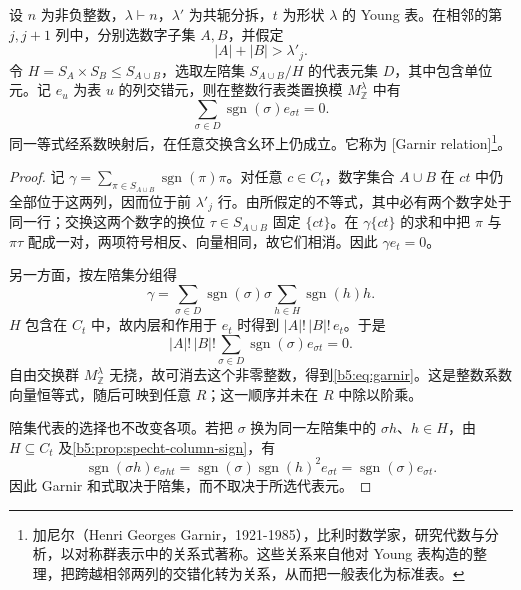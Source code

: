 \begin{lemma}[Garnir 关系]\label{b5:lem:garnir}
	设 \(n\) 为非负整数，\(\lambda\vdash n\)，\(\lambda'\) 为共轭分拆，\(t\) 为形状 \(\lambda\) 的 Young 表。在相邻的第 \(j,j+1\) 列中，分别选数字子集 \(A,B\)，并假定
	\[
		|A|+|B|>\lambda'_j.
	\]
	令 \(H=S_A\times S_B\leq S_{A\cup B}\)，选取左陪集 \(S_{A\cup B}/H\) 的代表元集 \(D\)，其中包含单位元。记 \(e_u\) 为表 \(u\) 的列交错元，则在整数行表类置换模 \(M_{\mathbb Z}^\lambda\) 中有
	\begin{equation}\label{b5:eq:garnir}
		\sum_{\sigma\in D}\operatorname{sgn}(\sigma)e_{\sigma t}=0.
	\end{equation}
	同一等式经系数映射后，在任意交换含幺环上仍成立。它称为 [Garnir relation]\footnote{加尼尔（Henri Georges Garnir，1921-1985），比利时数学家，研究代数与分析，以对称群表示中的关系式著称。这些关系来自他对 Young 表构造的整理，把跨越相邻两列的交错化转为关系，从而把一般表化为标准表。}。
\end{lemma}
\begin{proof}
	记 \(\gamma=\sum_{\pi\in S_{A\cup B}}\operatorname{sgn}(\pi)\pi\)。对任意 \(c\in C_t\)，数字集合 \(A\cup B\) 在 \(ct\) 中仍全部位于这两列，因而位于前 \(\lambda'_j\) 行。由所假定的不等式，其中必有两个数字处于同一行；交换这两个数字的换位 \(\tau\in S_{A\cup B}\) 固定 \(\{ct\}\)。在 \(\gamma\{ct\}\) 的求和中把 \(\pi\) 与 \(\pi\tau\) 配成一对，两项符号相反、向量相同，故它们相消。因此 \(\gamma e_t=0\)。

	另一方面，按左陪集分组得
	\[
		\gamma=\sum_{\sigma\in D}\operatorname{sgn}(\sigma)\sigma \sum_{h\in H}\operatorname{sgn}(h)h.
	\]
	\(H\) 包含在 \(C_t\) 中，故内层和作用于 \(e_t\) 时得到 \(|A|!\,|B|!\,e_t\)。于是
	\[
		|A|!\,|B|!\sum_{\sigma\in D}\operatorname{sgn}(\sigma)e_{\sigma t}=0.
	\]
	自由交换群 \(M_{\mathbb Z}^\lambda\) 无挠，故可消去这个非零整数，得到\eqref{b5:eq:garnir}。这是整数系数向量恒等式，随后可映到任意 \(R\)；这一顺序并未在 \(R\) 中除以阶乘。

	陪集代表的选择也不改变各项。若把 \(\sigma\) 换为同一左陪集中的 \(\sigma h\)、\(h\in H\)，由 \(H\subseteq C_t\) 及\cref{b5:prop:specht-column-sign}，有
	\[
		\operatorname{sgn}(\sigma h)e_{\sigma ht} =\operatorname{sgn}(\sigma)\operatorname{sgn}(h)^2e_{\sigma t} =\operatorname{sgn}(\sigma)e_{\sigma t}.
	\]
	因此 Garnir 和式取决于陪集，而不取决于所选代表元。
\end{proof}

